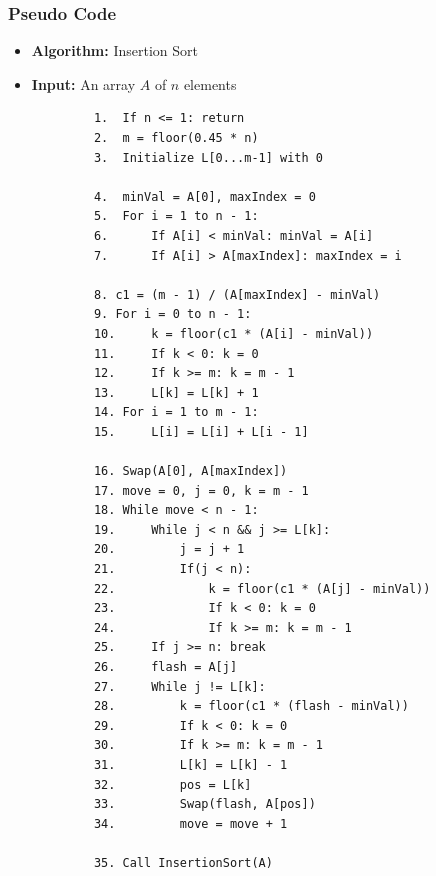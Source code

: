     \subsubsection{Pseudo Code}
        \begin{itemize}
            \item \textbf{Algorithm:} Insertion Sort
            \item \textbf{Input:} An array $A$ of $n$ elements
        \end{itemize}
        \begin{verbatim}
            1.  If n <= 1: return
            2.  m = floor(0.45 * n)
            3.  Initialize L[0...m-1] with 0

            4.  minVal = A[0], maxIndex = 0
            5.  For i = 1 to n - 1:
            6.      If A[i] < minVal: minVal = A[i]
            7.      If A[i] > A[maxIndex]: maxIndex = i

            8. c1 = (m - 1) / (A[maxIndex] - minVal)
            9. For i = 0 to n - 1:
            10.     k = floor(c1 * (A[i] - minVal))
            11.     If k < 0: k = 0
            12.     If k >= m: k = m - 1
            13.     L[k] = L[k] + 1
            14. For i = 1 to m - 1:
            15.     L[i] = L[i] + L[i - 1]

            16. Swap(A[0], A[maxIndex])
            17. move = 0, j = 0, k = m - 1
            18. While move < n - 1:
            19.     While j < n && j >= L[k]:
            20.         j = j + 1
            21.         If(j < n):
            22.             k = floor(c1 * (A[j] - minVal))
            23.             If k < 0: k = 0
            24.             If k >= m: k = m - 1
            25.     If j >= n: break
            26.     flash = A[j]
            27.     While j != L[k]:
            28.         k = floor(c1 * (flash - minVal))
            29.         If k < 0: k = 0
            30.         If k >= m: k = m - 1
            31.         L[k] = L[k] - 1
            32.         pos = L[k]
            33.         Swap(flash, A[pos])
            34.         move = move + 1

            35. Call InsertionSort(A)
        \end{verbatim}
